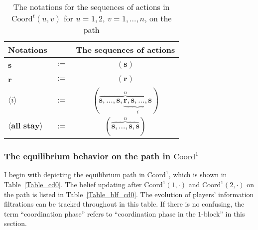 \documentclass[12pt,letter]{article}
\newcommand{\Kappa}{\mathrm{Coord}}
\theoremstyle{definition}
\theoremstyle{remark}
\theoremstyle{claim}
\begin{document}
\begin{table}[!htbp]
\caption{The notations for the sequences of actions in $\Kappa^t(u,v)$ for $u=1,2$, $v=1,...,n$, on the path}
\label{Table_msg_coordination}
\begin{center}
\begin{tabular}{l c c}
Notations & &The sequences of actions \\
\hline
\hline
\textbf{s} & $:=$ & $(\textbf{s})$\\
\textbf{r} & $:=$ & $(\textbf{r})$\\
$\langle i \rangle$ 				& $:=$ 			& $(\overbrace{ \textbf{s},...,\textbf{s},\underbrace{\textbf{r},\textbf{s},...,\textbf{s}}_{i}}^{n} )$  \\
$\langle \textbf{all stay} \rangle$	 					& $:=$ 			& $( \overbrace{\textbf{s},...,\textbf{s},{\textbf{s}}}^{n} )$  \\
\hline
\end{tabular}
\end{center}
\end{table}


\subsubsection{The equilibrium behavior on the path in $\Kappa^1$}
\label{sec:cd0}
I begin with depicting the equilibrium path in $\Kappa^1$, which is shown in Table~\ref{Table_cd0}. The belief updating after $\Kappa^1(1,\cdot)$ and $\Kappa^1(2,\cdot)$ on the path is listed in Table~\ref{Table_blf_cd0}. The evolution of players' information filtrations can be tracked throughout in this table. %
If there is no confusing, the term ``coordination phase'' refers to ``coordination phase in the $1$-block'' in this section.
\end{document}
